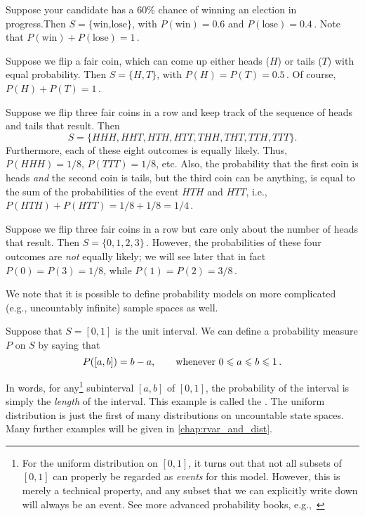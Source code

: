 \begin{example}
    Suppose your candidate has a 60\% chance of winning an election in progress.Then $S=\{\text{win,lose}\}$, with
    $P(\text{win})=0.6$ and $P(\text{lose})=0.4$\,. Note that $P(\text{win})+P(\text{lose})=1$\,.
\end{example}

\begin{example}
    Suppose we flip a fair coin, which can come up either heads ($H$) or tails ($T$) with equal probability. Then
    $S=\{H, T\}$, with $P(H)=P(T)=0.5$\,. Of course, $P(H)+P(T)=1$\,.
\end{example}

\begin{example}
    Suppose we flip three fair coins in a row and keep track of the sequence of heads and tails that result. Then
    $$
    S = \{HHH, HHT, HTH, HTT, THH, THT, TTH, TTT\}.
    $$
    Furthermore, each of these eight outcomes is equally likely. Thus, $P(HHH)=1/8$, $P(TTT)=1/8$, etc. Also, the
    probability that the first coin is heads \emph{and} the second coin is tails, but the third coin can be anything,
    is equal to the sum of the probabilities of the event $HTH$ and $HTT$, i.e., $P(HTH)+P(HTT)=1/8+1/8=1/4$\,.
\end{example}

\begin{example}
    Suppose we flip three fair coins in a row but care only about the number of heads that result. Then
    $S=\{0,1,2,3\}$\,. However, the probabilities of these four outcomes are \emph{not} equally likely; we will see
    later that in fact $P(0)=P(3)=1/8$, while $P(1)=P(2)=3/8$\,.
\end{example}


We note that it is possible to define probability models on more complicated (e.g., uncountably infinite) sample
spaces as well.

\begin{example}
    Suppose that $S=[0,1]$ is the unit interval. We can define a probability measure $P$ on $S$ by saying that
    \begin{equation}
        P([a,b]) = b-a,\qquad \text{whenever $0 \leqslant a \leqslant b \leqslant 1$\,.}
    \end{equation}

    In words, for any\footnote{For the uniform distribution on $[0,1]$, it turns out that not all subsets of $[0,1]$
    can properly be regarded as \emph{events} for this model. However, this is merely a technical property, and any
    subset that we can explicitly write down will always be an event. See more advanced probability books,
    e.g.,~\cite[page 3]{B1}} subinterval $[a,b]$ of $[0,1]$, the probability of the interval is simply the
    \emph{length} of the interval. This example is called the . The uniform
    distribution is just the first of many distributions on uncountable state spaces. Many
    further examples will be given in \autoref{chap:rvar_and_dist}.
\end{example}

